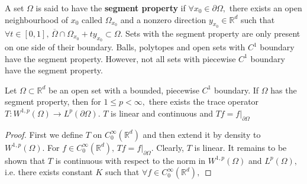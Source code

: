 A set $\Omega$ is said to have the \textbf{segment property} if $\forall x_0\in\partial\Omega,$ there exists an open neighbourhood of $x_0$ called $\Omega_{x_0}$ and a nonzero direction $y_{x_0}\in\mathbb{R}^d$ such that $\forall t\in[0,1],\,\overline{\Omega}\cap\Omega_{x_0}+ty_{x_0}\subset\Omega.$ Sets with the segment property are only present on one side of their boundary. Balls, polytopes and open sets with $C^1$ boundary have the segment property. However, not all sets with piecewise $C^1$ boundary have the segment property.
\begin{theorem}
    Let $\Omega\subset\mathbb{R}^d$  be an open set with a bounded, piecewise $C^1$ boundary. If $\Omega$ has the segment property, then for $1\leq p<\infty,$ there exists the trace operator $T:W^{1,p}(\Omega)\rightarrow L^p(\partial\Omega).$ $T$ is linear and continuous and $Tf=f|_{\partial\Omega}$
\end{theorem}
\begin{proof}
    First we define $T$ on $C_0^\infty(\mathbb{R}^d)$ and then extend it by density to $W^{1,p}(\Omega).$ For $f\in C^\infty_0(\mathbb{R}^d),\,Tf=f|_{\partial\Omega}.$ Clearly, $T$ is linear. It remains to be shown that $T$ is continuous with respect to the norm in $W^{1,p}(\Omega)$ and $L^p(\Omega),$ i.e. there exists constant $K$ such that $\forall f\in C^\infty_0(\mathbb{R}^d),$
\end{proof}

